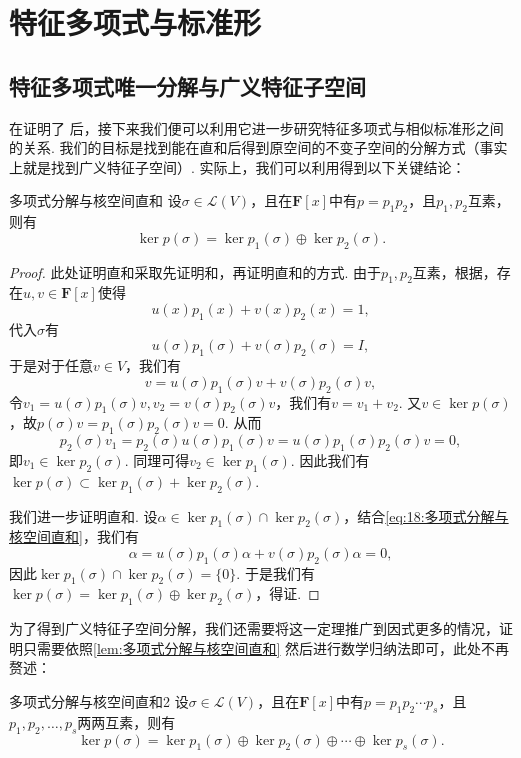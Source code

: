 \section{特征多项式与标准形}
\subsection{特征多项式唯一分解与广义特征子空间}

在证明了 后，接下来我们便可以利用它进一步研究特征多项式与相似标准形之间的关系. 我们的目标是找到能在直和后得到原空间的不变子空间的分解方式（事实上就是找到广义特征子空间）. 实际上，我们可以利用得到以下关键结论：
\begin{lemma}{}{多项式分解与核空间直和}
    设$\sigma\in \mathcal{L}(V)$，且在$\mathbf{F}[x]$中有$p=p_1p_2$，且$p_1,p_2$互素，则有
    \[\ker p(\sigma)=\ker p_1(\sigma)\oplus\ker p_2(\sigma).\]
\end{lemma}

\begin{proof}
    此处证明直和采取先证明和，再证明直和的方式. 由于$p_1,p_2$互素，根据，存在$u,v\in\mathbf{F}[x]$使得
    \[u(x)p_1(x)+v(x)p_2(x)=1,\]
    代入$\sigma$有
    \[u(\sigma)p_1(\sigma)+v(\sigma)p_2(\sigma)=I,\]
    于是对于任意$v\in V$，我们有
    \begin{equation} \label{eq:18:多项式分解与核空间直和}
        v=u(\sigma)p_1(\sigma)v+v(\sigma)p_2(\sigma)v,
    \end{equation}
    令$v_1=u(\sigma)p_1(\sigma)v,v_2=v(\sigma)p_2(\sigma)v$，我们有$v=v_1+v_2$. 又$v\in \ker p(\sigma)$，故$p(\sigma)v=p_1(\sigma)p_2(\sigma)v=0$. 从而
    \[p_2(\sigma)v_1=p_2(\sigma)u(\sigma)p_1(\sigma)v=u(\sigma)p_1(\sigma)p_2(\sigma)v=0,\]
    即$v_1\in \ker p_2(\sigma)$. 同理可得$v_2\in \ker p_1(\sigma)$. 因此我们有$\ker p(\sigma)\subset \ker p_1(\sigma)+\ker p_2(\sigma)$.

    我们进一步证明直和. 设$\alpha\in \ker p_1(\sigma)\cap \ker p_2(\sigma)$，结合\autoref{eq:18:多项式分解与核空间直和}，我们有
    \[\alpha=u(\sigma)p_1(\sigma)\alpha+v(\sigma)p_2(\sigma)\alpha=0,\]
    因此$\ker p_1(\sigma)\cap \ker p_2(\sigma)=\{0\}$. 于是我们有$\ker p(\sigma)=\ker p_1(\sigma)\oplus\ker p_2(\sigma)$，得证.
\end{proof}

为了得到广义特征子空间分解，我们还需要将这一定理推广到因式更多的情况，证明只需要依照\autoref{lem:多项式分解与核空间直和} 然后进行数学归纳法即可，此处不再赘述：
\begin{corollary}{}{多项式分解与核空间直和2}
    设$\sigma\in \mathcal{L}(V)$，且在$\mathbf{F}[x]$中有$p=p_1p_2\cdots p_s$，且$p_1,p_2,\ldots,p_s$两两互素，则有\[\ker p(\sigma)=\ker p_1(\sigma)\oplus\ker p_2(\sigma)\oplus\cdots\oplus\ker p_s(\sigma).\]
\end{corollary}

